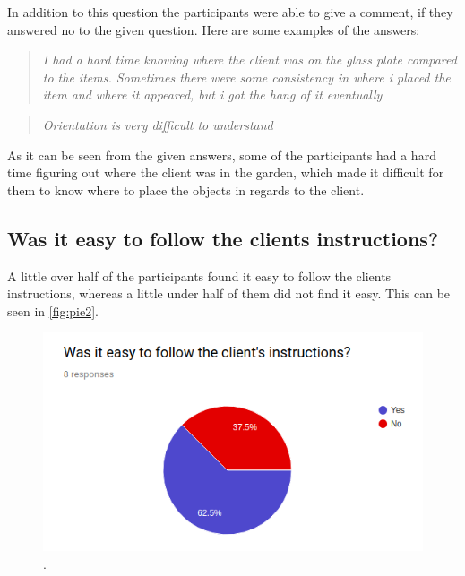 In addition to this question the participants were able to give a comment, if they answered no to the given question. Here are some examples of the answers:\\

 \begin{quote}
 	
\textit{I had a hard time knowing where the client was on the glass plate compared to the items. Sometimes there were some consistency in where i placed the item and where it appeared, but i got the hang of it eventually}\\
  \end{quote}
  
  \begin{quote}
  \textit{Orientation is very difficult to understand}\\
  \end{quote}	
 	 
 	As it can be seen from the given answers, some of the participants had a hard time figuring out where the client was in the garden, which made it difficult for them to know where to place the objects in regards to the client.
 

\subsection*{Was it easy to follow the clients instructions?}
A little over half of the participants found it easy to follow the clients instructions, whereas a little under half of them did not find it easy. This can be seen in \autoref{fig:pie2}.

\begin{figure}[H]
	\centering
	\includegraphics[width=0.9\linewidth]{figure/Evaluation/pie2.png}
	\caption{.}
	\label{fig:pie2}
\end{figure}

